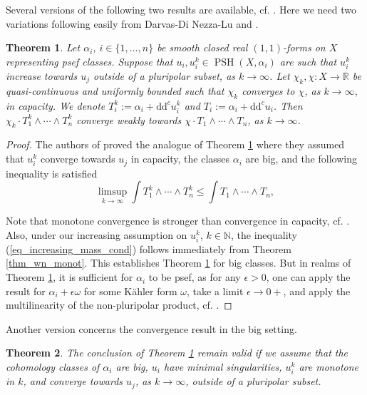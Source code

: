 \documentclass[12pt]{article}
\numberwithin{equation}{section}
\theoremstyle{theorem}
\newtheorem{thm}{Theorem}[section]
\theoremstyle{definition}
\theoremstyle{remark}
\newcommand{\real}{\mathbb{R}}
\newcommand{\nat}{\mathbb{N}}
\newcommand{\ddc}{\mathrm{d} \mathrm{d}^c}
\newcommand{\psh}{\operatorname{PSH}}
\begin{document}
	\par 
	Several versions of the following two results are available, cf. \cite[Theorem 2.17]{BEGZ}. 
	Here we need two variations following easily from Darvas-Di Nezza-Lu \cite[Theorem 2.3 and Remark 2.5]{DDLMonoton} and \cite[Theorem 2.6 and Remark 3.4]{DDLSurvey}.
	\begin{thm}\label{thm_cont_begz}
		Let $\alpha_i$, $i \in \{1, \ldots, n\}$ be smooth closed real $(1, 1)$-forms on $X$ representing psef classes. 
		Suppose that $u_i, u_i^k \in \psh(X, \alpha_i)$ are such that $u_i^k$ increase towards $u_j$ outside of a pluripolar subset, as $k \to \infty$.
		Let $\chi_k, \chi : X \to \real$ be quasi-continuous and uniformly bounded such that $\chi_k$ converges to $\chi$, as $k \to \infty$, in capacity.
		We denote $T_i^k := \alpha_i + \ddc u_i^k$ and $T_i := \alpha_i + \ddc u_i$.
		Then $\chi_k \cdot T_1^k \wedge \cdots \wedge T_n^k$ converge weakly towards $\chi \cdot T_1 \wedge \cdots \wedge T_n$, as $k \to \infty$.
	\end{thm}
	\begin{proof}
		The authors of \cite{DDLSurvey} proved the analogue of Theorem \ref{thm_cont_begz} where they assumed that $u_i^k$ converge towards $u_j$ in capacity, the classes $\alpha_i$ are big, and the following inequality is satisfied 
		\begin{equation}\label{eq_increasing_mass_cond}
			\limsup_{k \to \infty} \int T_1^k \wedge \cdots \wedge T_n^k
			\leq
			\int T_1 \wedge \cdots \wedge T_n,
		\end{equation}
		\par 
		Note that monotone convergence is stronger than convergence in capacity, cf. \cite[Theorem 4.25]{GuedjZeriahBook}.
		Also, under our increasing assumption on $u_i^k$, $k \in \nat$, the inequality (\ref{eq_increasing_mass_cond}) follows immediately from Theorem \ref{thm_wn_monot}.
		This establishes Theorem \ref{thm_cont_begz} for big classes. 
		But in realms of Theorem \ref{thm_cont_begz}, it is sufficient for $\alpha_i$ to be psef, as for any $\epsilon > 0$, one can apply the result for $\alpha_i + \epsilon \omega$ for some K\"ahler form $\omega$, take a limit $\epsilon \to 0+$, and apply the multilinearity of the non-pluripolar product, cf. \cite[Proposition 1.4c)]{BEGZ}.
	\end{proof}
	Another version concerns the convergence result in the big setting.
	\begin{thm}\label{thm_cont_begz2}
		The conclusion of Theorem \ref{thm_cont_begz} remain valid if we assume that the cohomology classes of $\alpha_i$ are big, $u_i$ have minimal singularities, $u_i^k$ are monotone in $k$, and converge towards $u_j$, as $k \to \infty$, outside of a pluripolar subset.
	\end{thm}
\end{document}
